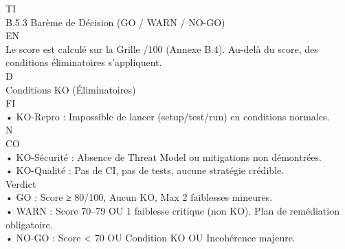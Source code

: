 \vspace{0.5em}
\vspace{0.5em}
\vspace{0.5em}
TI\\
B.5.3 Barème de Décision (GO / WARN / NO-GO)\\
\vspace{0.5em}
\vspace{0.5em}
\vspace{0.5em}
\vspace{0.5em}
EN\\
Le score est calculé sur la Grille /100 (Annexe B.4). Au-delà du score, des conditions éliminatoires s’appliquent.\\
\vspace{0.5em}
\vspace{0.5em}
\vspace{0.5em}
\vspace{0.5em}
D\\
Conditions KO (Éliminatoires)\\
\vspace{0.5em}
\vspace{0.5em}
\vspace{0.5em}
\vspace{0.5em}
FI\\
• KO-Repro : Impossible de lancer (setup/test/run) en conditions normales.\\
\vspace{0.5em}
N\\
CO\\
• KO-Sécurité : Absence de Threat Model ou mitigations non démontrées.\\
\vspace{0.5em}
• KO-Qualité : Pas de CI, pas de tests, aucune stratégie crédible.\\
\vspace{0.5em}
\vspace{0.5em}
Verdict\\
\vspace{0.5em}
• GO : Score ≥ 80/100, Aucun KO, Max 2 faiblesses mineures.\\
\vspace{0.5em}
• WARN : Score 70–79 OU 1 faiblesse critique (non KO). Plan de remédiation obligatoire.\\
\vspace{0.5em}
• NO-GO : Score \textless{} 70 OU Condition KO OU Incohérence majeure.\\
\vspace{0.5em}
\vspace{0.5em}
